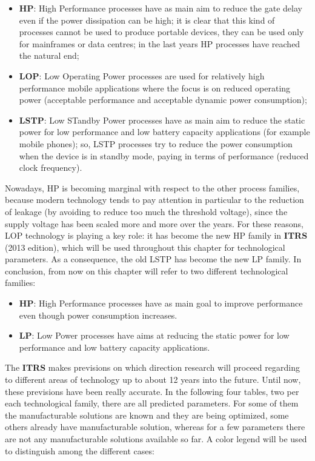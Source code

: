 \documentclass[a4paper, 12pt, twoside, openright]{report}
\begin{document}
	\begin{itemize}
	\item \textbf{HP}: High Performance processes have as main aim to reduce the gate delay even if the power dissipation can be high; it is clear that this kind of processes cannot be used to produce portable devices, they can be used only for mainframes or data centres; in the last years HP processes have reached the natural end;
	\item \textbf{LOP}: Low Operating Power processes are used for relatively high performance mobile applications where the focus is on reduced operating power (acceptable performance and acceptable dynamic power consumption);
	\item \textbf{LSTP}: Low STandby Power processes have as main aim to reduce the static power for low performance and low battery capacity applications (for example mobile phones); so, LSTP processes try to reduce the power consumption when the device is in standby mode, paying in terms of performance (reduced clock frequency).
	\end{itemize}

Nowadays, HP is becoming marginal with respect to the other process families, because modern technology tends to pay attention in particular to the reduction of leakage (by avoiding to reduce too much the threshold voltage), since the supply voltage has been scaled more and more over the years. For these reasons, LOP technology is playing a key role: it has become the new HP family in \textbf{ITRS} (2013 edition), which will be used throughout this chapter for technological parameters. As a consequence, the old LSTP has become the new LP family. In conclusion, from now on this chapter will refer to two different technological families:

\begin{itemize}
\item \textbf{HP}: High Performance processes have as main goal to improve performance even though power consumption increases.
\item \textbf{LP}: Low Power processes have aims at reducing the static power for low performance and low battery capacity applications.
\end{itemize}

The \textbf{ITRS} makes previsions on which direction research will proceed regarding to different areas of technology up to about 12 years into the future. Until now, these previsions have been really accurate. In the following four tables, two per each technological family, there are all predicted parameters. For some of them the manufacturable solutions are known and they are being optimized, some others already have manufacturable solution, whereas for a few parameters there are not any manufacturable solutions available so far. A color legend will be used to distinguish among the different cases:
\end{document}
